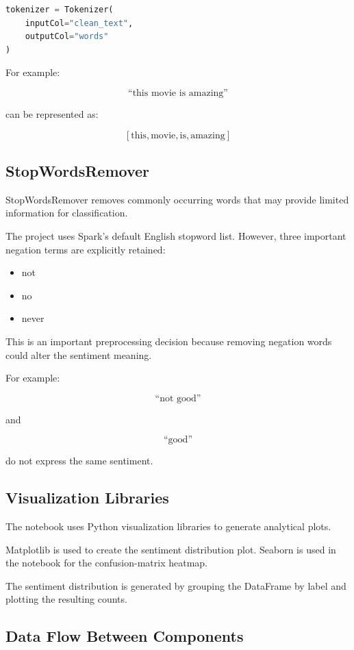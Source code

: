 \documentclass[12pt,a4paper]{article}
\begin{document}
\begin{lstlisting}[language=Python]
tokenizer = Tokenizer(
    inputCol="clean_text",
    outputCol="words"
)
\end{lstlisting}

For example:

\[
\text{``this movie is amazing''}
\]

can be represented as:

\[
[\text{this},\text{movie},\text{is},\text{amazing}]
\]

\subsection{StopWordsRemover}

StopWordsRemover removes commonly occurring words that may provide limited information for classification.

The project uses Spark's default English stopword list. However, three important negation terms are explicitly retained:

\begin{itemize}
    \item not
    \item no
    \item never
\end{itemize}

This is an important preprocessing decision because removing negation words could alter the sentiment meaning.

For example:

\[
\text{``not good''}
\]

and

\[
\text{``good''}
\]

do not express the same sentiment.




\subsection{Visualization Libraries}

The notebook uses Python visualization libraries to generate analytical plots.

Matplotlib is used to create the sentiment distribution plot. Seaborn is used in the notebook for the confusion-matrix heatmap.

The sentiment distribution is generated by grouping the DataFrame by label and plotting the resulting counts.


\subsection{Data Flow Between Components}
\end{document}
